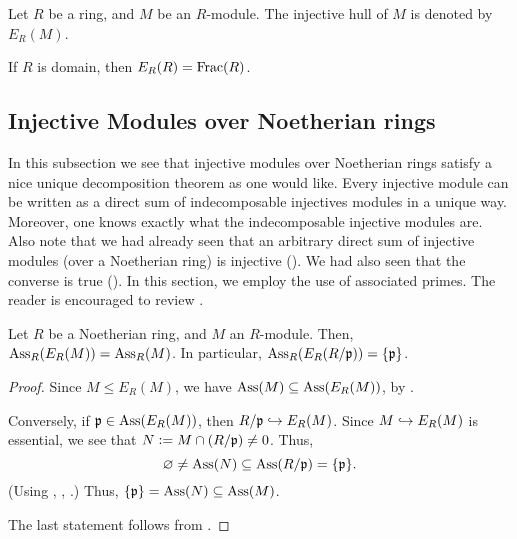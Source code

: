\begin{defn}
	Let $R$ be a ring, and $M$ be an $R$-module. The injective hull of $M$ is denoted by $E_{R}(M)$.
\end{defn}

\begin{ex}
	If $R$ is domain, then $E_{R}(R) = \operatorname{Frac}(R)$.
\end{ex}

\subsection{Injective Modules over Noetherian rings}

In this subsection we see that injective modules over Noetherian rings satisfy a nice unique decomposition theorem as one would like. Every injective module can be written as a direct sum of indecomposable injectives modules in a unique way. Moreover, one knows exactly what the indecomposable injective modules are. Also note that we had already seen that an arbitrary direct sum of injective modules (over a Noetherian ring) is injective (). We had also seen that the converse is true (). \newline
In this section, we employ the use of associated primes. The reader is encouraged to review . 

\begin{prop} \label{prop:ass-of-injective-hull}
	Let $R$ be a Noetherian ring, and $M$ an $R$-module. Then, $\operatorname{Ass}_{R}(E_{R}(M)) = \operatorname{Ass}_{R}(M)$. In particular, $\operatorname{Ass}_{R}(E_{R}(R/\mathfrak{p})) = \{\mathfrak{p}\}$.
\end{prop}
\begin{proof} 
	Since $M \le E_{R}(M)$, we have $\operatorname{Ass}(M) \subseteq \operatorname{Ass}(E_{R}(M))$, by . 

	Conversely, if $\mathfrak{p} \in \operatorname{Ass}(E_{R}(M))$, then $R/\mathfrak{p} \hookrightarrow E_{R}(M)$. Since $M \hookrightarrow E_{R}(M)$ is essential, we see that $N \vcentcolon= M \cap (R/\mathfrak{p}) \neq 0$. Thus,
	\begin{equation*} 
		\varnothing \neq \operatorname{Ass}(N) \subseteq \operatorname{Ass}(R/\mathfrak{p}) = \{\mathfrak{p}\}.
	\end{equation*}
	(Using , , .) Thus, $\{\mathfrak{p}\} = \operatorname{Ass}(N) \subseteq \operatorname{Ass}(M)$.

	The last statement follows from .
\end{proof}

